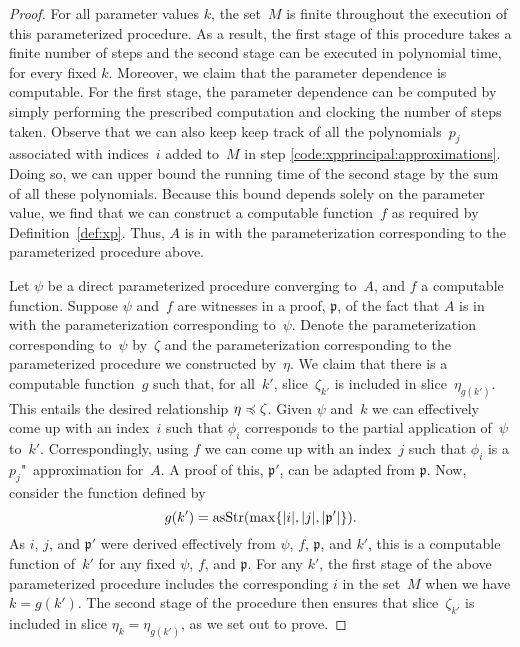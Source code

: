 \begin{proof}
  For all parameter values $k$, the set~$M$ is finite throughout the execution of this parameterized procedure.
  As a result, the first stage of this procedure takes a finite number of steps and the second stage can be executed in polynomial time, for every fixed $k$.
  Moreover, we claim that the parameter dependence is computable.
  For the first stage, the parameter dependence can be computed by simply performing the prescribed computation and clocking the number of steps taken.
  Observe that we can also keep keep track of all the polynomials~$p_j$ associated with indices~$i$ added to~$M$ in step \ref{code:xpprincipal:approximations}.
  Doing so, we can upper bound the running time of the second stage by the sum of all these polynomials.
  Because this bound depends solely on the parameter value, we find that we can construct a computable function~$f$ as required by Definition~\ref{def:xp}.
  Thus, $A$ is in  with the parameterization corresponding to the parameterized procedure above.

  Let $\psi$ be a direct parameterized procedure converging to~$A$, and $f$ a computable function.
  Suppose $\psi$ and~$f$ are witnesses in a proof, $\mathfrak{p}$, of the fact that $A$ is in  with the parameterization corresponding to~$\psi$.
  Denote the parameterization corresponding to~$\psi$ by~$\zeta$ and the parameterization corresponding to the parameterized procedure we constructed by~$\eta$.
  We claim that there is a computable function~$g$ such that, for all~$k'$, slice~$\zeta_{k'}$ is included in slice~$\eta_{g(k')}$.
  This entails the desired relationship $\eta \preccurlyeq \zeta$.
  Given $\psi$ and~$k$ we can effectively come up with an index~$i$ such that $\phi_i$ corresponds to the partial application of~$\psi$ to~$k'$.
  Correspondingly, using $f$ we can come up with an index~$j$ such that $\phi_i$ is a $p_j$"~approximation for~$A$.
  A proof of this, $\mathfrak{p}'$, can be adapted from $\mathfrak{p}$.
  Now, consider the function defined by
  \begin{equation*}
    g(k') = \operatorname{asStr}(\max\{{\lvert i\rvert}, {\lvert j\rvert}, {\lvert\mathfrak{p}'\rvert}\}).
  \end{equation*}
  As $i$, $j$, and $\mathfrak{p}'$ were derived effectively from $\psi$, $f$, $\mathfrak{p}$, and $k'$, this is a computable function of~$k'$ for any fixed $\psi$, $f$, and $\mathfrak{p}$.
  For any $k'$, the first stage of the above parameterized procedure includes the corresponding $i$ in the set~$M$ when we have $k = g(k')$.
  The second stage of the procedure then ensures that slice~$\zeta_{k'}$ is included in slice $\eta_k = \eta_{g(k')}$, as we set out to prove.
\end{proof}


